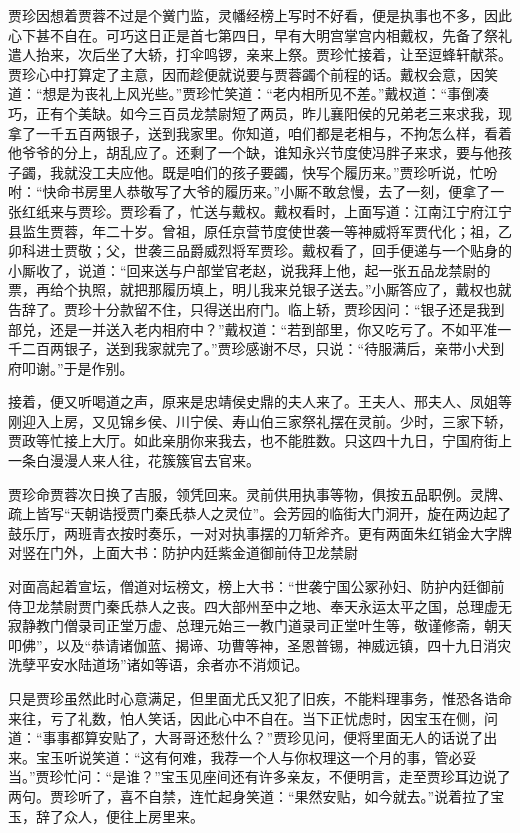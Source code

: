 \documentclass[12pt,oneside]{book}
\begin{document}
贾珍因想着贾蓉不过是个黉门监，灵幡经榜上写时不好看，便是执事也不多，因此心下甚不自在。可巧这日正是首七第四日，早有大明宫掌宫内相戴权，先备了祭礼遣人抬来，次后坐了大轿，打伞鸣锣，亲来上祭。贾珍忙接着，让至逗蜂轩献茶。贾珍心中打算定了主意，因而趁便就说要与贾蓉蠲个前程的话。戴权会意，因笑道：“想是为丧礼上风光些。”贾珍忙笑道：“老内相所见不差。”戴权道：“事倒凑巧，正有个美缺。如今三百员龙禁尉短了两员，昨儿襄阳侯的兄弟老三来求我，现拿了一千五百两银子，送到我家里。你知道，咱们都是老相与，不拘怎么样，看着他爷爷的分上，胡乱应了。还剩了一个缺，谁知永兴节度使冯胖子来求，要与他孩子蠲，我就没工夫应他。既是咱们的孩子要蠲，快写个履历来。”贾珍听说，忙吩咐：“快命书房里人恭敬写了大爷的履历来。”小厮不敢怠慢，去了一刻，便拿了一张红纸来与贾珍。贾珍看了，忙送与戴权。戴权看时，上面写道：江南江宁府江宁县监生贾蓉，年二十岁。曾祖，原任京营节度使世袭一等神威将军贾代化；祖，乙卯科进士贾敬；父，世袭三品爵威烈将军贾珍。戴权看了，回手便递与一个贴身的小厮收了，说道：“回来送与户部堂官老赵，说我拜上他，起一张五品龙禁尉的票，再给个执照，就把那履历填上，明儿我来兑银子送去。”小厮答应了，戴权也就告辞了。贾珍十分款留不住，只得送出府门。临上轿，贾珍因问：“银子还是我到部兑，还是一并送入老内相府中？”戴权道：“若到部里，你又吃亏了。不如平准一千二百两银子，送到我家就完了。”贾珍感谢不尽，只说：“待服满后，亲带小犬到府叩谢。”于是作别。

接着，便又听喝道之声，原来是忠靖侯史鼎的夫人来了。王夫人、邢夫人、凤姐等刚迎入上房，又见锦乡侯、川宁侯、寿山伯三家祭礼摆在灵前。少时，三家下轿，贾政等忙接上大厅。如此亲朋你来我去，也不能胜数。只这四十九日，宁国府街上一条白漫漫人来人往，花簇簇官去官来。

贾珍命贾蓉次日换了吉服，领凭回来。灵前供用执事等物，俱按五品职例。灵牌、疏上皆写“天朝诰授贾门秦氏恭人之灵位”。会芳园的临街大门洞开，旋在两边起了鼓乐厅，两班青衣按时奏乐，一对对执事摆的刀斩斧齐。更有两面朱红销金大字牌对竖在门外，上面大书：防护内廷紫金道御前侍卫龙禁尉

对面高起着宣坛，僧道对坛榜文，榜上大书：“世袭宁国公冢孙妇、防护内廷御前侍卫龙禁尉贾门秦氏恭人之丧。四大部州至中之地、奉天永运太平之国，总理虚无寂静教门僧录司正堂万虚、总理元始三一教门道录司正堂叶生等，敬谨修斋，朝天叩佛”，以及“恭请诸伽蓝、揭谛、功曹等神，圣恩普锡，神威远镇，四十九日消灾洗孽平安水陆道场”诸如等语，余者亦不消烦记。

只是贾珍虽然此时心意满足，但里面尤氏又犯了旧疾，不能料理事务，惟恐各诰命来往，亏了礼数，怕人笑话，因此心中不自在。当下正忧虑时，因宝玉在侧，问道：“事事都算安贴了，大哥哥还愁什么？”贾珍见问，便将里面无人的话说了出来。宝玉听说笑道：“这有何难，我荐一个人与你权理这一个月的事，管必妥当。”贾珍忙问：“是谁？”宝玉见座间还有许多亲友，不便明言，走至贾珍耳边说了两句。贾珍听了，喜不自禁，连忙起身笑道：“果然安贴，如今就去。”说着拉了宝玉，辞了众人，便往上房里来。
\end{document}
